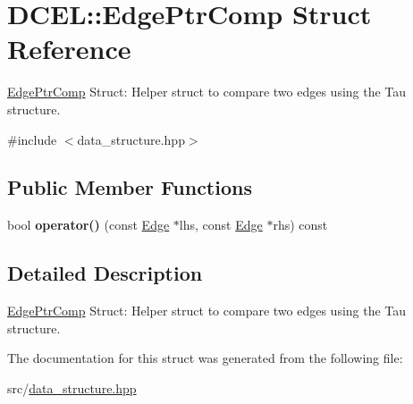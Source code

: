 \hypertarget{structDCEL_1_1EdgePtrComp}{}\section{D\+C\+EL\+:\+:Edge\+Ptr\+Comp Struct Reference}
\label{structDCEL_1_1EdgePtrComp}


\hyperlink{structDCEL_1_1EdgePtrComp}{Edge\+Ptr\+Comp} Struct\+: Helper struct to compare two edges using the Tau structure.  




{\ttfamily \#include $<$data\+\_\+structure.\+hpp$>$}

\subsection*{Public Member Functions}
\begin{DoxyCompactItemize}
\item 
\mbox{\label{structDCEL_1_1EdgePtrComp_adeed54ffca3d038aa5c2612455662c40}} 
bool {\bfseries operator()} (const \hyperlink{structEdge}{Edge} $\ast$lhs, const \hyperlink{structEdge}{Edge} $\ast$rhs) const
\end{DoxyCompactItemize}


\subsection{Detailed Description}
\hyperlink{structDCEL_1_1EdgePtrComp}{Edge\+Ptr\+Comp} Struct\+: Helper struct to compare two edges using the Tau structure. 

The documentation for this struct was generated from the following file\+:\begin{DoxyCompactItemize}
\item 
src/\hyperlink{data__structure_8hpp}{data\+\_\+structure.\+hpp}\end{DoxyCompactItemize}
